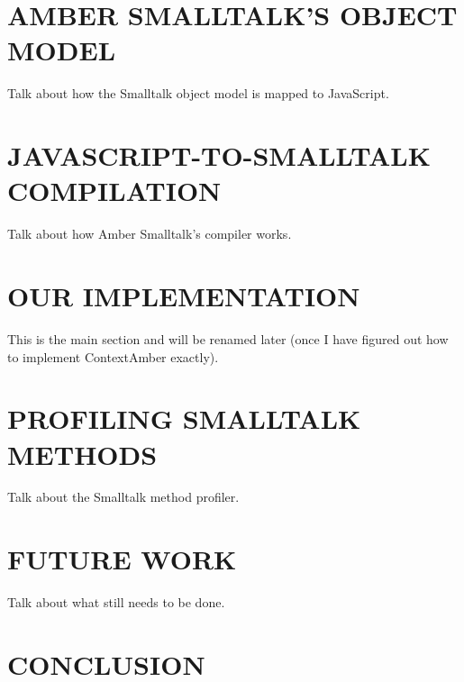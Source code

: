 \documentclass{sig-alternate}
\begin{document}
\section{AMBER SMALLTALK'S OBJECT MODEL}

Talk about how the Smalltalk object model is mapped to JavaScript.

\section{JAVASCRIPT-TO-SMALLTALK COMPILATION}
Talk about how Amber Smalltalk's compiler works.

\section{OUR IMPLEMENTATION}
This is the main section and will be renamed later (once I have figured out how to implement ContextAmber exactly).

\section{PROFILING SMALLTALK METHODS}
Talk about the Smalltalk method profiler.

\section{FUTURE WORK}
Talk about what still needs to be done.

\section{CONCLUSION}
\end{document}
